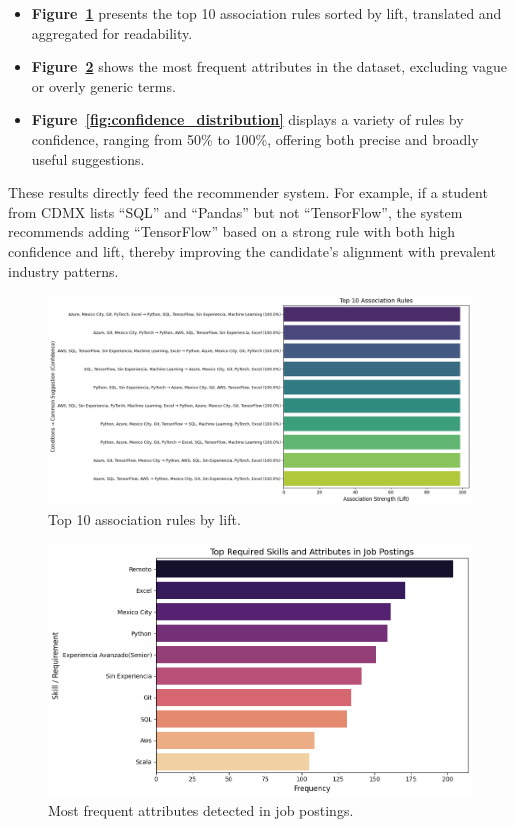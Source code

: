 \documentclass[12pt,a4paper]{article}
\begin{document}
	\begin{itemize}
		\item \textbf{Figure~\ref{fig:top_rules}} presents the top 10 association rules sorted by lift, translated and aggregated for readability.
		\item \textbf{Figure~\ref{fig:frequent_attrs}} shows the most frequent attributes in the dataset, excluding vague or overly generic terms.
		\item \textbf{Figure~\ref{fig:confidence_distribution}} displays a variety of rules by confidence, ranging from 50\% to 100\%, offering both precise and broadly useful suggestions.
	\end{itemize}
	
	
	These results directly feed the recommender system. For example, if a student from CDMX lists ``SQL'' and ``Pandas'' but not ``TensorFlow'', the system recommends adding ``TensorFlow'' based on a strong rule with both high confidence and lift, thereby improving the candidate's alignment with prevalent industry patterns.
	
		\begin{figure}[H]
		     \centering
		     \includegraphics[width=0.9\linewidth]{imagenes/top_rules.png}
		     \caption{Top 10 association rules by lift.}
		     \label{fig:top_rules}
		 \end{figure}
	
	 \begin{figure}[H]
		     \centering
		     \includegraphics[width=0.9\linewidth]{imagenes/frequent_attributes.png}
		     \caption{Most frequent attributes detected in job postings.}
		     \label{fig:frequent_attrs}
		 \end{figure}
	
\end{document}

